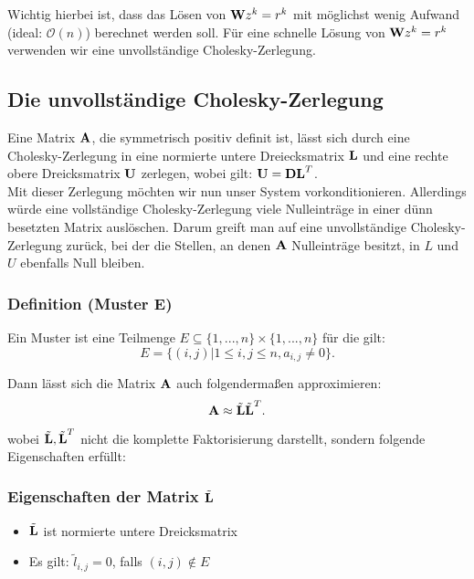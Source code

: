 Wichtig hierbei ist, dass das Lösen von ${\textbf{W}}z^{k} = r^{k}$ mit möglichst wenig Aufwand (ideal: $\mathcal{O}(n)$) berechnet werden soll. Für eine schnelle Lösung von ${\textbf{W}} z^{k} = r^{k}$ verwenden wir eine unvollständige Cholesky-Zerlegung.

\subsection{Die unvollständige Cholesky-Zerlegung}\label{ss.ICCG}

Eine Matrix ${\textbf{A}}$, die symmetrisch positiv definit ist, lässt sich durch eine Cholesky-Zerlegung in eine normierte untere Dreiecksmatrix ${\textbf{L}}$ und eine rechte obere Dreicksmatrix ${\textbf{U}}$ zerlegen, wobei gilt: ${\textbf{U}} = {\textbf{D}}{\textbf{L}}^{T}$. \\
Mit dieser Zerlegung möchten wir nun unser System vorkonditionieren. Allerdings würde eine vollständige Cholesky-Zerlegung viele Nulleinträge in einer dünn besetzten Matrix auslöschen. Darum greift man auf eine unvollständige Cholesky-Zerlegung zurück, bei der die Stellen, an denen ${\textbf{A}}$ Nulleinträge besitzt, in $L$ und $U$ ebenfalls Null bleiben.

\subsubsection{Definition (Muster E)}\label{sss.Muster E}

Ein Muster ist eine Teilmenge $E \subseteq \{1,...,n\} \times \{1,...,n\}$ für die gilt:
\begin{equation}
E = \{(i,j) | 1 \le i,j \le n, a_{i,j} \ne 0 \}.
\end{equation}

Dann lässt sich die Matrix ${\textbf{A}}$ auch folgendermaßen approximieren:
\begin{equation}
{\textbf{A}} \approx \tilde{{\textbf{L}}} \tilde{{\textbf{L}}}^{T}.
\end{equation}
wobei $\tilde{{\textbf{L}}}, \tilde{{\textbf{L}}}^{T}$ nicht die komplette Faktorisierung darstellt, sondern folgende Eigenschaften erfüllt:

\subsubsection{Eigenschaften der Matrix $\tilde{{\textbf{L}}}$}\label{sss.Eigenschaften L CZ}
\begin{itemize}
\item $\tilde{{\textbf{L}}}$ ist normierte untere Dreicksmatrix
\item Es gilt: $\tilde l_{i,j} = 0$, falls $(i,j) \notin E$
\end{itemize}

